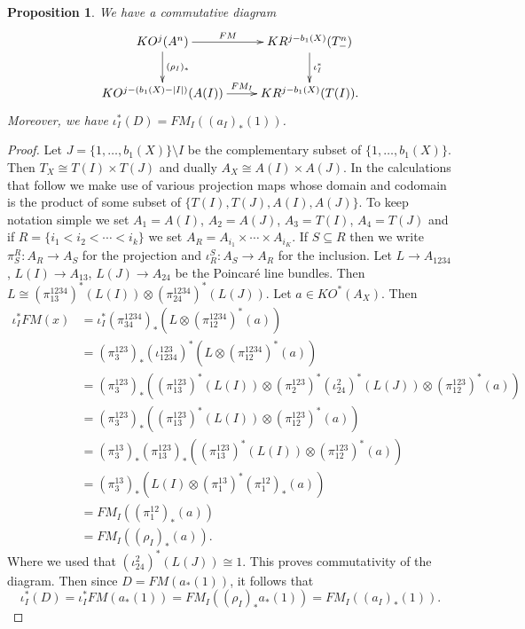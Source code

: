 \documentclass{amsart}
\newtheorem{proposition}[theorem]{Proposition}
\theoremstyle{definition}
\theoremstyle{remark}
\numberwithin{equation}{section}
\begin{document}
\begin{proposition}\label{prop:ftres}
We have a commutative diagram
\[
\xymatrix{
KO^j( A^n) \ar[r]^-{FM} \ar[d]^-{(\rho_I)_*} & KR^{j-b_1(X)}( T^n_- ) \ar[d]^-{\iota_I^*} \\
KO^{j-(b_1(X)-|I|)}(A(I)) \ar[r]^-{FM_I} & KR^{j-b_1(X)}( T(I) ).
}
\]
Moreover, we have $\iota_I^*( D) = FM_I( (a_I)_*(1) )$.
\end{proposition}
\begin{proof}
Let $J = \{1, \dots , b_1(X) \} \setminus I$ be the complementary subset of $\{1,\dots , b_1(X)\}$. Then $T_X \cong T(I) \times T(J)$ and dually $A_X \cong A(I) \times A(J)$. In the calculations that follow we make use of various projection maps whose domain and codomain is the product of some subset of $\{ T(I) , T(J) , A(I) , A(J) \}$. To keep notation simple we set $A_1 = A(I)$, $A_2 = A(J)$, $A_3 = T(I)$, $A_4 = T(J)$ and if $R = \{ i_1 < i_2 < \cdots < i_k\}$ we set $A_R = A_{i_1} \times \cdots \times A_{i_K}$. If $S \subseteq R$ then we write $\pi^R_S : A_R \to A_S$ for the projection and $\iota^S_R : A_S \to A_R$ for the inclusion. Let $L \to A_{1234}$, $L(I) \to A_{13}$, $L(J) \to A_{24}$ be the Poincar\'e line bundles. Then $L \cong (\pi^{1234}_{13})^*(L(I)) \otimes (\pi^{1234}_{24})^*(L(J))$. Let $a \in KO^*(A_X)$. Then
\begin{align*}
\iota_I^* FM(x) &= \iota_I^* (\pi_{34}^{1234})_* ( L \otimes (\pi^{1234}_{12})^*(a) ) \\
&= (\pi^{123}_{3})_* ( \iota^{123}_{1234} )^* ( L \otimes (\pi^{1234}_{12})^*(a) ) \\
&= (\pi^{123}_{3})_* \left( (\pi^{123}_{13})^*(L(I)) \otimes (\pi^{123}_{2})^* ( \iota^2_{24})^*(L(J)) \otimes (\pi^{123}_{12})^*(a) \right) \\
&= (\pi^{123}_{3})_* \left( (\pi^{123}_{13})^*(L(I)) \otimes (\pi^{123}_{12})^*(a) \right) \\
&= (\pi^{13}_{3})_* (\pi^{123}_{13})_* \left( (\pi^{123}_{13})^*(L(I)) \otimes (\pi^{123}_{12})^*(a) \right) \\
&= (\pi^{13}_{3})_* \left( L(I) \otimes (\pi^{13}_1)^* ( \pi^{12}_{1} )_*(a) \right) \\
&= FM_I( (\pi^{12}_{1})_*(a) ) \\
&= FM_I( (\rho_I)_*(a) ).
\end{align*}
Where we used that $(\iota^2_{24})^*(L(J)) \cong 1$. This proves commutativity of the diagram. Then since $D = FM( a_*(1))$, it follows that
\[
\iota_I^*(D) = \iota_I^* FM( a_*(1) ) = FM_I( (\rho_I)_* a_* (1) ) = FM_I( (a_I)_*(1)).
\]
\end{proof}
\end{document}
